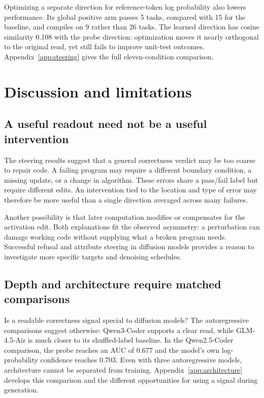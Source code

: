 \documentclass[11pt,letterpaper]{article}
\begin{document}
Optimizing a separate direction for reference-token log probability also lowers performance. Its global positive arm passes 5 tasks, compared with 15 for the baseline, and compiles on 9 rather than 26 tasks. The learned direction has cosine similarity 0.108 with the probe direction: optimization moves it nearly orthogonal to the original read, yet still fails to improve unit-test outcomes. Appendix~\ref{app:steering} gives the full eleven-condition comparison.

\section{Discussion and limitations}\label{sec:discussion}

\subsection{A useful readout need not be a useful intervention}

The steering results suggest that a general correctness verdict may be too coarse to repair code. A failing program may require a different boundary condition, a missing update, or a change in algorithm. These errors share a pass/fail label but require different edits. An intervention tied to the location and type of error may therefore be more useful than a single direction averaged across many failures.

Another possibility is that later computation modifies or compensates for the activation edit. Both explanations fit the observed asymmetry: a perturbation can damage working code without supplying what a broken program needs. Successful refusal and attribute steering in diffusion models provides a reason to investigate more specific targets and denoising schedules.\citep{shnaidman2026,zhou2026}

\subsection{Depth and architecture require matched comparisons}\label{sec:comparison}

Is a readable correctness signal special to diffusion models? The autoregressive comparisons suggest otherwise: Qwen3-Coder supports a clear read, while GLM-4.5-Air is much closer to its shuffled-label baseline. In the Qwen2.5-Coder comparison, the probe reaches an AUC of 0.677 and the model's own log-probability confidence reaches 0.703. Even with three autoregressive models, architecture cannot be separated from training. Appendix~\ref{app:architecture} develops this comparison and the different opportunities for using a signal during generation.
\end{document}
